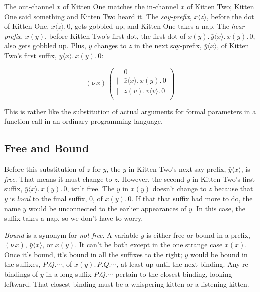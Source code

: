 \documentclass[10pt,oneside,x11names]{article}
\newcommand\napping    [0]{0}
\newcommand\chatting   [3]{\bar{#1}\langle{#2}\rangle{}.\,#3}
\newcommand\listening  [3]{#1(#2).\,#3}
\newcommand\whispering [2]{(\nu\,#1)\,{#2}}
\newcommand{\kitOne}{\chatting{x}{z}{\napping}}
\newcommand{\kitTwo}{\listening{x}{y}{\chatting{y}{x}{\listening{x}{y}{\napping}}}}
\newcommand{\kitTwoSuffixx}{\chatting{y}{x}{\listening{x}{y}{\napping}}}
\newcommand{\kitTwoHearSuffix}{\listening{x}{y}{\napping}}
\theoremstyle{definition}
\theoremstyle{warning}
\begin{document}
The out-channel \(\bar{x}\) of Kitten One matches the in-channel \(x\)
of Kitten Two; Kitten One said something and Kitten Two heard it.
The \emph{say-prefix}, \(\bar{x}\langle{}z\rangle\), before the dot of
Kitten One, \(\kitOne\), gets gobbled up, and Kitten One takes a
nap. The \emph{hear-prefix}, \(x(y)\), before Kitten Two's first dot, the
first dot of \(\kitTwo\), also gets gobbled up. Plus, \(y\) changes to
\(z\) in the next say-prefix, \(\bar{y}\langle{x}\rangle\), of Kitten
Two's first suffix, \(\kitTwoSuffixx\):

\begin{equation}
\whispering{x}{\left(
\begin{array}{clll}
 {}     & \napping  \\
 \vert  & \chatting{z}{x}{\listening{x}{y}{\napping}} \\
 \vert  & \listening{z}{v}{\chatting{v}{v}{\napping}} \\
\end{array}\right)}
\end{equation}

This is rather like the substitution of actual arguments for
formal parameters in a function call in an ordinary programming
language.

\subsection{Free and Bound}
\label{sec:org52b9d0b}

Before this substitution of \(z\) for \(y\), the \(y\) in Kitten Two's
next say-prefix, \(\bar{y}\langle{x}\rangle\), is \emph{free}. That means
it must change to \(z\). However, the second \(y\) in Kitten Two's
first suffix, \(\kitTwoSuffixx\), isn't free. The \(y\) in \(x(y)\)
doesn't change to \(z\) because that \(y\) is \emph{local} to the final
suffix, \(0\), of \(\kitTwoHearSuffix\). If that that suffix had more
to do, the name \(y\) would be unconnected to the earlier
appearances of \(y\). In this case, the suffix takes a nap, so we
don't have to worry.

\emph{Bound} is a synonym for \emph{not free}. A variable \(y\) is either free
or bound in a prefix, \((\nu\,x)\), \(\bar{y}\langle{x}\rangle\), or
\(x(y)\). It can't be both except in the one strange case \(x(x)\).
Once it's bound, it's bound in all the suffixes to the right; \(y\)
would be bound in the suffixes, \(P.Q.\cdots\), of
\(\listening{x}{y}{P.Q.\cdots}\), at least up until the next
binding. Any re-bindings of \(y\) in a long suffix \(P.Q.\cdots\)
pertain to the closest binding, looking leftward. That closest
binding must be a whispering kitten or a listening kitten.
\end{document}

